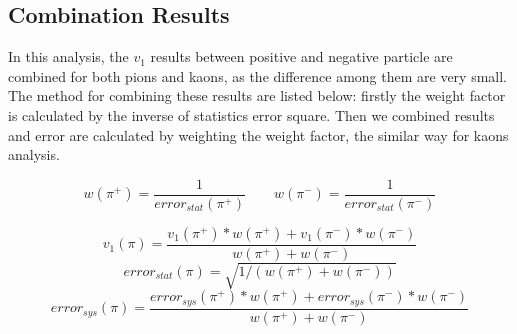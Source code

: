 \subsection{Combination Results}

In this analysis, the $v_1$ results between positive and negative particle are combined for both pions and kaons, as the difference among them are very small. 
The method for combining these results are listed below: firstly the weight factor is calculated by the inverse of statistics error square. Then we combined results and error are calculated by weighting the weight factor, the similar way for kaons analysis.

\begin{equation}
    w (\pi^{+}) = \frac{1}{error_{stat}(\pi^{+})} \qquad
    w (\pi^{-}) = \frac{1}{error_{stat}(\pi^{-})}
\end{equation}

\begin{equation}
    v_{1}(\pi) = \frac{v_{1}(\pi^{+})*w(\pi^{+}) + v_{1}(\pi^{-})*w(\pi^{-})}{w(\pi^{+})+w(\pi^{-})}
\end{equation}
\begin{equation}
    error_{stat}(\pi) = \sqrt{1/(w(\pi^{+})+w(\pi^{-}))}
\end{equation}
\begin{equation}
    error_{sys}(\pi) = \frac{error_{sys}(\pi^{+})*w(\pi^{+}) + error_{sys}(\pi^{-})*w(\pi^{-})}{w(\pi^{+})+w(\pi^{-})}
\end{equation}



















